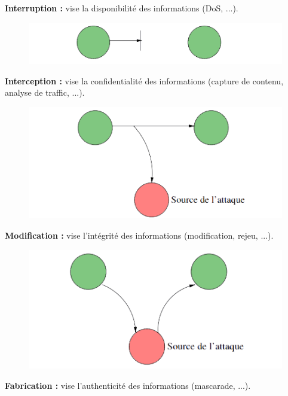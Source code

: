 \documentclass[journal, a4paper]{IEEEtran}
\begin{document}
		\textbf{Interruption :} vise la disponibilité des informations (DoS, ...).
		
		\begin{figure}[!hbt]
			\begin{center}
				\includegraphics[width=\columnwidth]{img/but_inter.png}
				\label{fig:but_inter}
			\end{center}
		\end{figure}
		\textbf{Interception :} vise la confidentialité des informations (capture de contenu, analyse de traffic, ...).
		
		\begin{figure}[!hbt]
			\begin{center}
				\includegraphics[width=\columnwidth]{img/but_intercep.png}
				\label{fig:but_intercep}
			\end{center}
		\end{figure}
		\newpage
		\textbf{Modification :} vise l'intégrité des informations (modification, rejeu, ...).
		
		\begin{figure}[!hbt]
			\begin{center}
				\includegraphics[width=\columnwidth]{img/but_modif.png}
				\label{fig:but_modif}
			\end{center}
		\end{figure}
		\textbf{Fabrication :} vise l'authenticité des informations (mascarade, ...).
		
\end{document}
